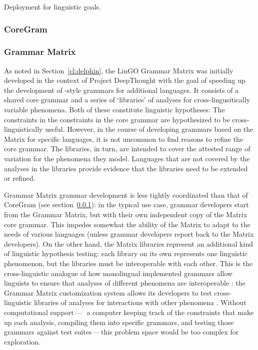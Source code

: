 \documentclass[output=paper,nonflat]{langsci/langscibook}
\begin{document}
Deployment for linguistic goals.


\subsubsection{CoreGram}
\label{cl:coregram}

\subsubsection{Grammar Matrix}

As noted in Section~\ref{cl:delphin}, the LinGO Grammar Matrix
\cite{BFO2002a-u,BDFPS2010a-u} was initially developed in
the context of Project DeepThought with the goal of speeding up the
development of \delphin-style grammars for additional languages. It
consists of a shared core grammar and a series of `libraries' of
analyses for cross-lingusitically variable phenomena. Both of these
constitute linguistic hypotheses: The constraints in the constraints
in the core grammar are hypothesized to be cross-linguistically
useful. However, in the course of developing grammars based on the
Matrix for specific languages, it is not uncommon to find reasons to
refine the core grammar. The libraries, in turn, are intended to 
cover the attested range of variation for the phenomena they model.
Languages that are not covered by the analyses in the libraries provide
evidence that the libraries need to be extended or refined. 

Grammar Matrix grammar development is less tightly coordinated than
that of CoreGram (see section~\ref{cl:coregram}): in the typical use case,
grammar developers start from the Grammar Matrix, but with their own
independent copy of the Matrix core grammar. This impedes somewhat the
ability of the Matrix to adapt to the needs of various languages
(unless grammar developers report back to the Matrix developers).  On
the other hand, the Matrix libraries represent an additional kind of
linguistic hypothesis testing: each library on its own represents one
linguistic phenomenon, but the libraries must be interoperable with
each other. This is the cross-linguistic analogue of how monolingual
implemented grammars allow linguists to ensure that analyses of
different phenomena are interoperable
\citep{Mueller99a,Bender2008c-Short}: the Grammar Matrix customization
system allows its developers to test cross-linguistic libraries of
analyses for interactions with other phenomena
\citep{BFO2011a-u,Bender:16}. Without computational
support\,---\,\ie\ a computer keeping track of the constraints that
make up each analysis, compiling them into specific grammars, and
testing those grammars against test suites\,---\,this problem space
would be too complex for exploration.
\end{document}
